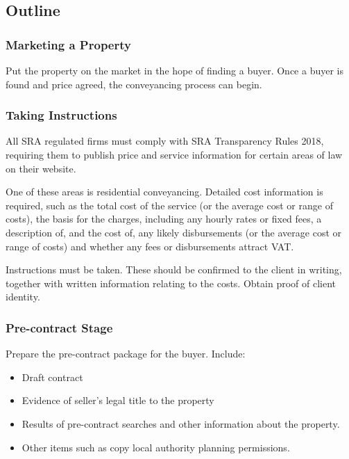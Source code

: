 \documentclass[
]{article}
\providecommand{\tightlist}{%
  \setlength{\itemsep}{0pt}\setlength{\parskip}{0pt}}
\begin{document}
\hypertarget{outline}{%
\subsection{Outline}\label{outline}}

\hypertarget{marketing-a-property}{%
\subsubsection{Marketing a Property}\label{marketing-a-property}}

Put the property on the market in the hope of finding a buyer. Once a
buyer is found and price agreed, the conveyancing process can begin.

\hypertarget{taking-instructions}{%
\subsubsection{Taking Instructions}\label{taking-instructions}}

All SRA regulated firms must comply with SRA Transparency Rules 2018,
requiring them to publish price and service information for certain
areas of law on their website.

One of these areas is residential conveyancing. Detailed cost
information is required, such as the total cost of the service (or the
average cost or range of costs), the basis for the charges, including
any hourly rates or fixed fees, a description of, and the cost of, any
likely disbursements (or the average cost or range of costs) and whether
any fees or disbursements attract VAT.

Instructions must be taken. These should be confirmed to the client in
writing, together with written information relating to the costs. Obtain
proof of client identity.

\hypertarget{pre-contract-stage}{%
\subsubsection{Pre-contract Stage}\label{pre-contract-stage}}

Prepare the pre-contract package for the buyer. Include:

\begin{itemize}
\tightlist
\item
  Draft contract
\item
  Evidence of seller's legal title to the property
\item
  Results of pre-contract searches and other information about the
  property.
\item
  Other items such as copy local authority planning permissions.
\end{itemize}
\end{document}
